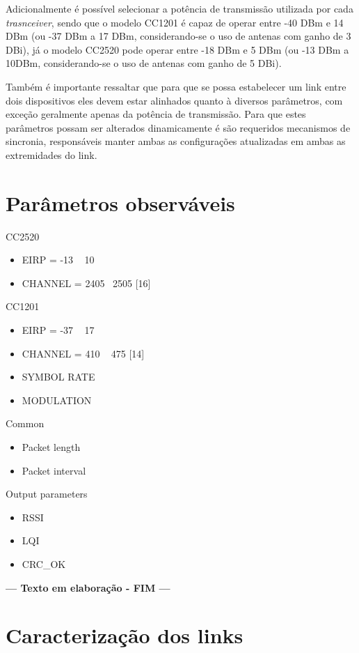 \documentclass[
	12pt,				%
	openright,			%
	oneside,
	a4paper,			%
	english,			%
	french,				%
	spanish,			%
	brazil				%
	]{abntex2}
\begin{document}
	Adicionalmente é possível selecionar a potência de transmissão utilizada por cada \textit{trasnceiver}, sendo que o modelo CC1201 é capaz de operar entre -40 DBm e 14 DBm (ou -37 DBm a 17 DBm, considerando-se o uso de antenas com ganho de 3 DBi), já o modelo CC2520 pode operar entre -18 DBm e 5 DBm (ou -13 DBm a 10DBm, considerando-se o uso de antenas com ganho de 5 DBi).
	
	Também é importante ressaltar que para que se possa estabelecer um link entre dois dispositivos eles devem estar alinhados quanto à diversos parâmetros, com exceção geralmente apenas da potência de transmissão. Para que estes parâmetros possam ser alterados dinamicamente é são requeridos mecanismos de sincronia, responsáveis manter ambas as configurações atualizadas em ambas as extremidades do link.
	\section{Parâmetros observáveis}
	CC2520
	\begin{itemize}
		\item EIRP = -13 ~ 10
		\item CHANNEL = 2405 ~2505 [16]
	\end{itemize}
	CC1201
	\begin{itemize}
		\item EIRP = -37 ~ 17
		\item CHANNEL = 410 ~ 475 [14]
		\item SYMBOL RATE
		\item MODULATION
	\end{itemize}
	Common
	\begin{itemize}
		\item Packet length
		\item Packet interval
	\end{itemize}
	Output parameters
	\begin{itemize}
		\item RSSI
		\item LQI
		\item CRC\_OK
	\end{itemize}
	
\begin{center}
	\textbf{--- Texto em elaboração - FIM ---}
\end{center}
	
\section{Caracterização dos links}
\end{document}
